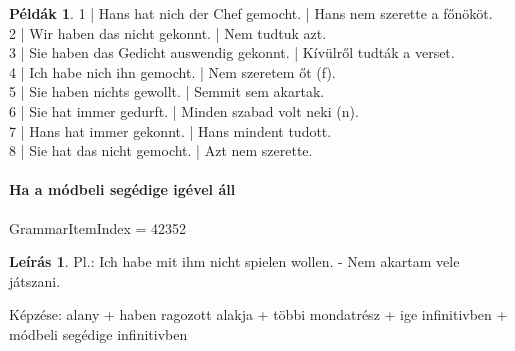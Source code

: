 \documentclass{article}
\theoremstyle{definition}
\newtheorem*{exmp}{Példák}
\newtheorem*{desc}{Leírás}
\begin{document}
\begin{exmp}
1 | Hans hat nich der Chef gemocht. | Hans nem szerette a főnököt.\\
2 | Wir haben das nicht gekonnt. | Nem tudtuk azt.\\
3 | Sie haben das Gedicht auswendig gekonnt. | Kívülről tudták a verset.\\
4 | Ich habe nich ihn gemocht. | Nem szeretem őt (f).\\
5 | Sie haben nichts gewollt. | Semmit sem akartak.\\
6 | Sie hat immer gedurft. | Minden szabad volt neki (n).\\
7 | Hans hat immer gekonnt. | Hans mindent tudott.\\
8 | Sie hat das nicht gemocht. | Azt nem szerette.\\
\end{exmp}

\paragraph{Ha a módbeli segédige igével áll}

GrammarItemIndex = 42352

\begin{desc}
Pl.: Ich habe mit ihm nicht spielen wollen. - Nem akartam vele játszani.

Képzése:
alany + haben ragozott alakja + többi mondatrész + ige infinitivben + módbeli segédige infinitivben
\end{desc}
\end{document}
